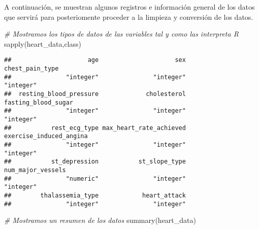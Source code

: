 \documentclass[
]{article}
\newenvironment{Shaded}{\begin{snugshade}}{\end{snugshade}}
\newcommand{\CommentTok}[1]{\textcolor[rgb]{0.56,0.35,0.01}{\textit{#1}}}
\newcommand{\FunctionTok}[1]{\textcolor[rgb]{0.00,0.00,0.00}{#1}}
\newcommand{\NormalTok}[1]{#1}
\begin{document}
A continuación, se muestran algunos registros e información general de
los datos que servirá para posteriomente proceder a la limpieza y
conversión de los datos.

\begin{Shaded}
\begin{Highlighting}[]
\CommentTok{\# Mostramos los tipos de datos de las variables tal y como las interpreta R }
\FunctionTok{sapply}\NormalTok{(heart\_data,class)}
\end{Highlighting}
\end{Shaded}

\begin{verbatim}
##                     age                     sex         chest_pain_type 
##               "integer"               "integer"               "integer" 
##  resting_blood_pressure             cholesterol     fasting_blood_sugar 
##               "integer"               "integer"               "integer" 
##           rest_ecg_type max_heart_rate_achieved exercise_induced_angina 
##               "integer"               "integer"               "integer" 
##           st_depression           st_slope_type       num_major_vessels 
##               "numeric"               "integer"               "integer" 
##        thalassemia_type            heart_attack 
##               "integer"               "integer"
\end{verbatim}

\begin{Shaded}
\begin{Highlighting}[]
\CommentTok{\# Mostramos un resumen de los datos}
\FunctionTok{summary}\NormalTok{(heart\_data)}
\end{Highlighting}
\end{Shaded}
\end{document}
